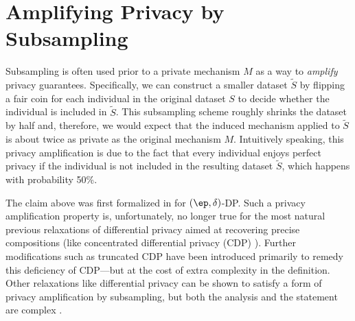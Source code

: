 \section{Amplifying Privacy by Subsampling}
\label{sec:subsampling}

\newcommand{\Sample}{\mathtt{Sample}}
\newcommand{\tm}{\widetilde{M}}
\newcommand{\Sn}{S\cup\{n\}}
\newcommand{\xv}{S}
%

Subsampling is often used prior to a private mechanism $M$ as a way to \textit{amplify} privacy guarantees. Specifically, we can construct a smaller dataset $\tilde S$ by flipping a fair coin for each individual in the original dataset $S$ to decide whether the individual is included in $\tilde{S}$. This subsampling scheme roughly shrinks the dataset by half and, therefore, we would expect that the induced mechanism applied to $\tilde S$ is about twice as private as the original mechanism $M$. Intuitively speaking, this privacy amplification is due to the fact that every individual enjoys perfect privacy if the individual is not included in the resulting dataset $\tilde S$, which happens with probability 50\%.

The claim above was first formalized in \cite{KLNRS} for $(\ep,\delta)$-DP. Such a privacy amplification property is, unfortunately, no longer true for the most natural previous relaxations of differential privacy aimed at recovering precise compositions (like concentrated differential privacy (CDP) \cite{concentrated,concentrated2}). Further modifications such as truncated CDP \cite{tcdp} have been introduced primarily to remedy this deficiency of CDP---but at the cost of extra complexity in the definition. Other relaxations like {\Renyi} differential privacy \cite{renyi} can be shown to satisfy a form of privacy amplification by subsampling, but both the analysis and the statement are complex \cite{wang2018subsampled}.


